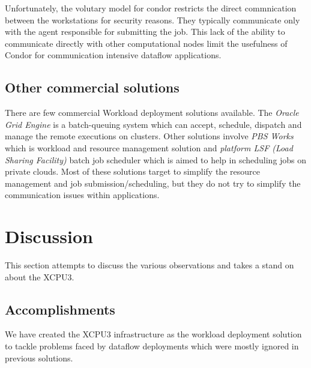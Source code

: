 \documentclass[conference]{IEEEtran}
\begin{document}
Unfortunately, the volutary model for condor restricts the direct commnication
between the workstations for security reasons.  They typically communicate
only with the agent responsible for submitting the job.  This lack of the
ability to communicate directly with other computational nodes limit the
usefulness of Condor for communication intensive dataflow applications.

\subsection{Other commercial solutions}
There are few commercial Workload deployment solutions available.  The
\textit{Oracle Grid Engine}\cite{oge} is a batch-queuing system which can
accept, schedule, dispatch and manage the remote executions on clusters. 
Other solutions involve \textit{PBS Works}\cite{pbsworks} which is workload
and resource management solution and \textit{platform LSF (Load Sharing
Facility)}\cite{platformLSF} batch job scheduler which is aimed to help in
scheduling jobs on private clouds.  Most of these solutions target to simplify
the resource management and job submission/scheduling, but they do not try to
simplify the communication issues within applications.


\section{Discussion}
 
This section attempts to discuss the various observations and takes a stand on
about the XCPU3.

\subsection{Accomplishments}
We have created the XCPU3 infrastructure as the workload deployment solution to
tackle problems faced by dataflow deployments which were mostly ignored in
previous solutions.
\end{document}
